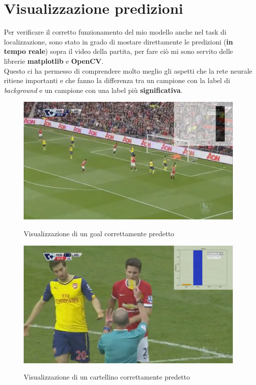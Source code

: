 \section{Visualizzazione predizioni}
Per verificare il corretto funzionamento del mio modello anche nel task di localizzazione, sono stato in grado di mostare direttamente le predizioni (\textbf{in tempo reale}) sopra il video della partita, per fare ciò mi sono servito delle librerie \textbf{matplotlib} e \textbf{OpenCV}.
\\Questo ci ha permesso di comprendere molto meglio gli aspetti che la rete neurale ritiene importanti e che fanno la differenza tra un campione con la label di \textit{background} e un campione con una label più \textbf{significativa}.

\begin{figure}[ht]
\centering
\caption{Visualizzazione di un goal correttamente predetto}
\includegraphics[width=\linewidth]{img/videogoal.png}
\label{figure : videogoal}
\end{figure}
\begin{figure}[H]
\centering
\caption{Visualizzazione di un cartellino correttamente predetto}
\includegraphics[width=\linewidth]{img/videocard.png}
\label{figure : videocard}
\end{figure}
